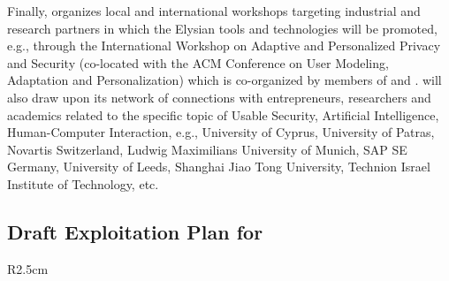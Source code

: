 \documentclass[a4paper,11pt]{article}
\newcommand{\project}[1]{\textbf{#1}\xspace}
\newcommand{\SECURITY}{\project{Elysian}}
\newcommand{\TheProject}{\SECURITY}
\begin{document}
Finally, \COGNIshort{} organizes local and international workshops targeting industrial and research partners in which the Elysian tools and technologies will be promoted, e.g., through the International Workshop on Adaptive and Personalized Privacy and Security (co-located with the ACM Conference on User Modeling, Adaptation and Personalization) which is co-organized by members of \COGNIshort{} and \USTANshort{}. \COGNIshort{} will also draw upon its network of connections with entrepreneurs, researchers and academics related to the specific topic of Usable Security, Artificial Intelligence, Human-Computer Interaction, e.g., University of Cyprus, University of Patras, Novartis Switzerland, Ludwig Maximilians University of Munich, SAP SE Germany, University of Leeds, Shanghai Jiao Tong University, Technion Israel Institute of Technology, etc.


\horizontalline

\subsection*{Draft Exploitation Plan for \SAshort{}}

\begin{wrapfigure}{R}{2.5cm}
\vspace{-1.4cm}
\hfill {}
\vspace{-0.9cm}
\end{wrapfigure}
\end{document}

